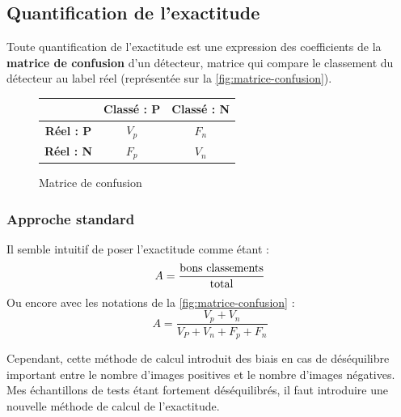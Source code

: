 \documentclass[12pt,a4paper]{article}
\begin{document}
\subsection{Quantification de l'exactitude}
Toute quantification de l'exactitude est une expression des coefficients de la \textbf{matrice de confusion} d'un détecteur, matrice qui compare le classement du détecteur au label réel (représentée sur la \autoref{fig:matrice-confusion}).

\begin{figure}
    \renewcommand{\arraystretch}{1.5}
    \begin{tabular}{|c|c|c|}
        \cline{2-3}
        \multicolumn{1}{c|}{} & \textbf{Classé : P} & \textbf{Classé : N} \\
        \hline
        \textbf{Réel : P} & $V_p$ & $F_n$ \\
        \hline
        \textbf{Réel : N} & $F_p$ & $V_n$ \\
        \hline
    \end{tabular}
    \caption{Matrice de confusion}
    \label{fig:matrice-confusion}
\end{figure}


\subsubsection{Approche standard}
Il semble intuitif de poser l'exactitude comme étant :
\[
    A = \frac{\textnormal{bons classements}}{\textnormal{total}}
\]
Ou encore avec les notations de la \autoref{fig:matrice-confusion} :
\begin{equation}
    \boxed{A = \frac{V_p + V_n}{V_P + V_n + F_p + F_n}}
\end{equation}

Cependant, cette méthode de calcul introduit des biais en cas de déséquilibre important entre le nombre d'images positives et le nombre d'images négatives. Mes échantillons de tests étant fortement déséquilibrés, il faut introduire une nouvelle méthode de calcul de l'exactitude.
\end{document}
